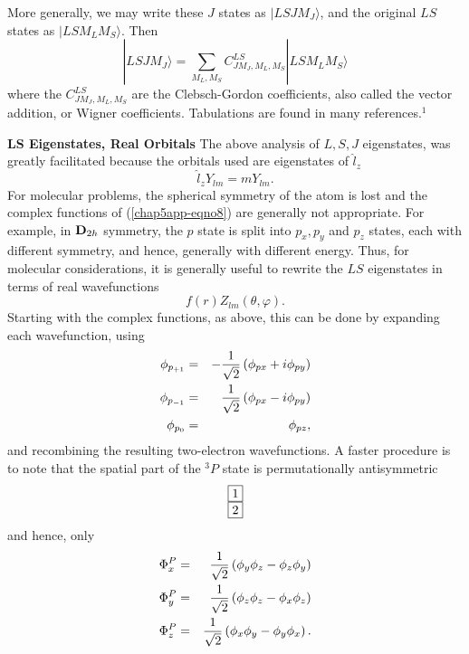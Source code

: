 More generally, we may write these $J$ states as $|LSJM_J \rangle$, 
and the original $LS$ states as $|LSM_LM_S \rangle$.  Then
\begin{equation}
|LSJM_J \rangle = \sum_{M_L,M_S} C^{LS}_{JM_J,M_L,M_S} | LSM_LM_S 
\rangle
\end{equation}
where the $C^{LS}_{JM_J,M_L,M_S}$ are the Clebsch-Gordon coefficients, 
also called the vector addition, or Wigner coefficients.  Tabulations 
are found in many references.$^1$

{\bf LS Eigenstates, Real Orbitals}
The above analysis of $L, S , J$ eigenstates, was greatly facilitated 
because the orbitals used are eigenstates of ${\hat l}_z$
\begin{equation}
{\hat l}_z Y_{lm} = mY_{lm} .
\label{chap5app-eqno8}
\end{equation}
For molecular problems, the spherical symmetry of the atom is lost 
and the complex functions of (\ref{chap5app-eqno8}) are generally not
appropriate.  For  
example, in ${\bf D}_{2h}$ symmetry, the $p$ state is split into 
$p_x , p_y$ and $p_z$ states, each with different symmetry, and hence, 
generally with different energy.  Thus, for molecular considerations, 
it is generally useful to rewrite the $LS$ eigenstates in terms of 
real wavefunctions
\begin{equation}
f(r) Z_{lm} ( \theta , \varphi ) .
\end{equation}
Starting with the complex functions, as above, this can be done by 
expanding each wavefunction, using
\begin{eqnarray}
\phi_{p_{+1}} &=& - {1 \over \sqrt{2}} \left( \phi_{px} + i \phi_{py} 
\right)\cr
\phi_{p_{-1}} &=& {1 \over \sqrt{2}} \left( \phi_{px} - i \phi_{py} 
\right)\cr
\phi_{p_0} &=& \phi_{pz} ,
\end{eqnarray}
and recombining the resulting two-electron wavefunctions.  A faster 
procedure is to note that the spatial part of the ${^3P}$ state is 
permutationally antisymmetric
\begin{equation}
\begin{array}{c}
\fbox{1}\\
\fbox{2}
\end{array}
\end{equation}
and hence, only
\begin{eqnarray}
\Phi^P_x &=& {1 \over \sqrt{2}} \left( \phi_y \phi_z - \phi_z \phi_y 
\right)\cr
\Phi^P_y &=& {1 \over \sqrt{2}} \left( \phi_z \phi_z - \phi_x \phi_z 
\right)\cr
\Phi^P_z &=& {1 \over \sqrt{2}} \left( \phi_x \phi_y - \phi_y \phi_x 
\right) .
\label{chap5app-eqno9}
\end{eqnarray}
